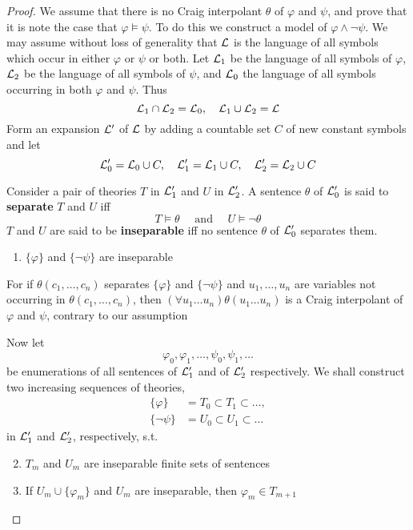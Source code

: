 \documentclass[11pt]{article}
\begin{document}
\begin{proof}
We assume that there is no Craig interpolant \(\theta\) of \(\varphi\) and \(\psi\), and prove that it
is note the case that \(\varphi\models\psi\). To do this we construct a model
of \(\varphi\wedge\neg\psi\). We may assume without loss of generality that
\(\mathcal{L}\) is the language of all symbols which occur in either \(\varphi\) or \(\psi\) or
both.
Let \(\mathcal{L}_1\) be the language of all symbols of \(\varphi\), \(\mathcal{L}_2\) be the
language of all symbols of \(\psi\), and \(\mathcal{L}_0\) the language of all symbols
occurring in both \(\varphi\) and \(\psi\). Thus
\begin{equation*}
\mathcal{L}_1\cap\mathcal{L}_2=\mathcal{L}_0,\quad
\mathcal{L}_1\cup\mathcal{L}_2=\mathcal{L}
\end{equation*}
Form an expansion \(\mathcal{L}'\) of \(\mathcal{L}\) by adding a countable set \(C\) of
new constant symbols and let
\begin{equation*}
\mathcal{L}_0'=\mathcal{L}_0\cup C,\quad
\mathcal{L}_1'=\mathcal{L}_1\cup C,\quad
\mathcal{L}_2'=\mathcal{L}_2\cup C
\end{equation*}

Consider a pair of theories \(T\) in \(\mathcal{L}_1'\) and \(U\) in \(\mathcal{L}_2'\).
A sentence \(\theta\) of \(\mathcal{L}_0'\) is said to \textbf{separate} \(T\) and \(U\) iff
\begin{equation*}
T\models\theta \quad\text{ and }\quad
U\models\neg\theta
\end{equation*}
\(T\) and \(U\) are said to be \textbf{inseparable} iff no sentence \(\theta\) of \(\mathcal{L}_0'\)
separates them.
\begin{enumerate}
\item \(\{\varphi\}\) and \(\{\neg\psi\}\) are inseparable
\end{enumerate}


For if \(\theta(c_1,\dots,c_n)\) separates \(\{\varphi\}\) and \(\{\neg\psi\}\)
and \(u_1,\dots,u_n\) are variables not occurring in \(\theta(c_1,\dots,c_n)\),
then \((\forall u_1\dots u_n)\theta(u_1\dots u_n)\) is a Craig interpolant of \(\varphi\)
and \(\psi\), contrary to our assumption

Now let
\begin{equation*}
\varphi_0,\varphi_1,\dots,\psi_0,\psi_1,\dots
\end{equation*}
be enumerations of all sentences of \(\mathcal{L}_1'\) and of \(\mathcal{L}_2'\)
respectively. We shall construct two increasing sequences of theories,
\begin{align*}
\{\varphi\}&=T_0\subset T_1\subset\dots,\\
\{\neg\psi\}&=U_0\subset U_1\subset\dots
\end{align*}
in \(\mathcal{L}_1'\) and \(\mathcal{L}_2'\), respectively, s.t.
\begin{enumerate}
\setcounter{enumi}{1}
\item \(T_m\) and \(U_m\) are inseparable finite sets of sentences
\item If \(U_m\cup\{\varphi_m\}\) and \(U_m\) are inseparable, then
\(\varphi_m\in T_{m+1}\)


\end{enumerate}
\end{proof}
\end{document}
